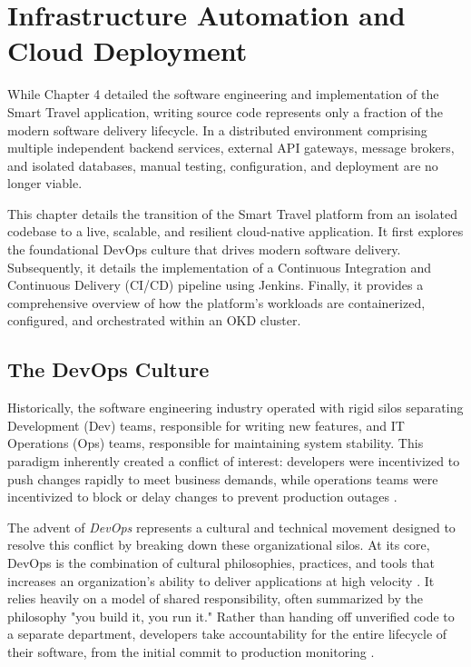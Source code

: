 \chapter{Infrastructure Automation and Cloud Deployment}
\label{sec:deployment}

While Chapter 4 detailed the software engineering and implementation of the Smart Travel application, writing source code represents only a fraction of the modern software delivery lifecycle. In a distributed environment comprising multiple independent backend services, external API gateways, message brokers, and isolated databases, manual testing, configuration, and deployment are no longer viable. 

This chapter details the transition of the Smart Travel platform from an isolated codebase to a live, scalable, and resilient cloud-native application. It first explores the foundational DevOps culture that drives modern software delivery. Subsequently, it details the implementation of a Continuous Integration and Continuous Delivery (\gls{CI/CD}) pipeline using Jenkins. Finally, it provides a comprehensive overview of how the platform's workloads are containerized, configured, and orchestrated within an OKD cluster.


\section{The DevOps Culture}
\label{sec:devops_culture}

Historically, the software engineering industry operated with rigid silos separating Development (Dev) teams, responsible for writing new features, and IT Operations (Ops) teams, responsible for maintaining system stability. This paradigm inherently created a conflict of interest: developers were incentivized to push changes rapidly to meet business demands, while operations teams were incentivized to block or delay changes to prevent production outages \cite{atlassian_devops_culture}.

The advent of \textit{DevOps} represents a cultural and technical movement designed to resolve this conflict by breaking down these organizational silos. At its core, DevOps is the combination of cultural philosophies, practices, and tools that increases an organization's ability to deliver applications at high velocity \cite{aws_what_is_devops}. It relies heavily on a model of shared responsibility, often summarized by the philosophy "you build it, you run it." Rather than handing off unverified code to a separate department, developers take accountability for the entire lifecycle of their software, from the initial commit to production monitoring \cite{atlassian_devops_culture}. 

